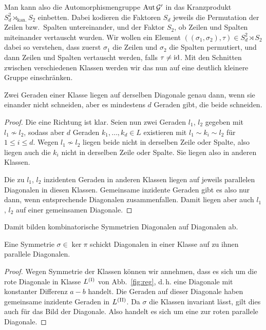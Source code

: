 Man kann also die Automorphismengruppe $\operatorname{Aut} \mathcal G'$ in das Kranzprodukt $S_d^2 \rtimes_{\text{kan.}} S_2$ einbetten. Dabei kodieren die Faktoren $S_d$ jeweils die Permutation der Zeilen bzw.~Spalten untereinander, und der Faktor $S_2$, ob Zeilen und Spalten miteinander vertauscht wurden. Wir wollen ein Element $((\sigma_1, \sigma_2), \tau) \in S_d^2 \rtimes S_2$ dabei so verstehen, dass zuerst $\sigma_1$ die Zeilen und $\sigma_2$ die Spalten permutiert, und dann Zeilen und Spalten vertauscht werden, falls $\tau \neq \operatorname{id}$. Mit den Schnitten zwischen verschiedenen Klassen werden wir das nun auf eine deutlich kleinere Gruppe einschränken.
\begin{prop}
Zwei Geraden einer Klasse liegen auf derselben Diagonale genau dann, wenn sie einander nicht schneiden, aber es mindestens $d$ Geraden gibt, die beide schneiden.
\end{prop}
\begin{proof}
Die eine Richtung ist klar. Seien nun zwei Geraden $l_1$, $l_2$ gegeben mit $l_1 \not\sim l_2$, sodass aber $d$ Geraden $k_1, \dots, k_d \in L$ existieren mit $l_1 \sim k_i \sim l_2$ für $1 \leq i \leq d$. Wegen $l_1 \not\sim l_2$ liegen beide nicht in derselben Zeile oder Spalte, also liegen auch die $k_i$ nicht in derselben Zeile oder Spalte. Sie liegen also in anderen Klassen.

Die zu $l_1$, $l_2$ inzidenten Geraden in anderen Klassen liegen auf jeweils parallelen Diagonalen in diesen Klassen. Gemeinsame inzidente Geraden gibt es also nur dann, wenn entsprechende Diagonalen zusammenfallen. Damit liegen aber auch $l_1$, $l_2$ auf einer gemeinsamen Diagonale.
\end{proof}
\begin{coroll}
Damit bilden kombinatorische Symmetrien Diagonalen auf Diagonalen ab.
\end{coroll}
\begin{prop}
Eine Symmetrie $\sigma \in \ker \pi$ schickt Diagonalen in einer Klasse auf zu ihnen parallele Diagonalen.
\end{prop}
\begin{proof}
Wegen Symmetrie der Klassen können wir annehmen, dass es sich um die rote Diagonale in Klasse $\Lcl(I)$ von Abb.~\ref{fig:reg}, d.\,h. eine Diagonale mit konstanter Differenz $a-b$ handelt. Die Geraden auf dieser Diagonale haben gemeinsame inzidente Geraden in $\Lcl(II)$. Da $\sigma$ die Klassen invariant lässt, gilt dies auch für das Bild der Diagonale. Also handelt es sich um eine zur roten parallele Diagonale.
\end{proof}

